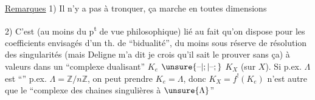 \uline{Remarques} 1) Il n'y a pas à tronquer, ça marche en toutes dimensions

2) C'est (au moins du p\textsuperscript{t} de vue philosophique) lié au fait qu'on dispose pour les coefficients envisagés  d'un th. de ``bidualité''\deleted{\unsure{)}}, du moins sous réserve de résolution des singularités (mais Deligne m'a dit je crois qu'il sait le prouver sans ça) à valeurs dans un ``complexe dualisant'' $K_e$  $\unsure{\text{--}|;|\text{--};}$ $K_X$ (sur $X$). Si p.ex. $\Lambda$ est ``''  p.ex. $\Lambda=\mathbb{Z}/n\mathbb{Z}$, on peut prendre $K_e=\Lambda$, donc  $K_X=f^!(K_e)$ n'est autre que le ``complexe des chaines singulières à   $\unsure{\Lambda}$'' 
